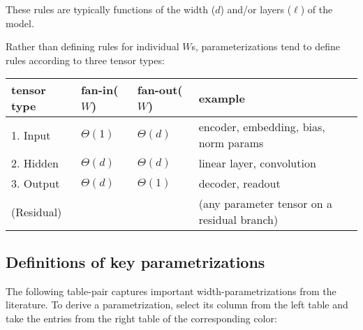 \documentclass{article}
\begin{document}
\noindent
These rules are typically functions of the width ($d$) and/or layers ($\ell$) of the model.

\vspace{0.5em}

\noindent
Rather than defining rules for individual $W$s, parameterizations tend to define rules according to three tensor types:

\vspace{-1em}
\noindent
\begin{table}[ht]
    \centering
    \begin{tabular}{@{}p{7em}@{}p{5em}p{5.5em}p{19em}}
        \toprule
        tensor type & fan-in($W$) & fan-out($W$) & example\\
        \midrule
        1. Input & $\Theta(1)$ & $\Theta(d)$ & encoder, embedding, bias, norm params\\
        2. Hidden & $\Theta(d)$ & $\Theta(d)$ & linear layer, convolution\\
        3. Output & $\Theta(d)$ & $\Theta(1)$ & decoder, readout\\
        (Residual) & & & (any parameter tensor on a residual branch)\\
        \bottomrule
    \end{tabular}
\end{table}

\vspace{-1.5em}

\subsection*{Definitions of key parametrizations}

The following table-pair captures important width-parametrizations from the literature. To derive a parametrization, select its column from the left table and take the entries from the right table of the corresponding color:

\def\arraystretch{1.5}%

\setlength{\aboverulesep}{0pt} %
\setlength{\belowrulesep}{0pt} %
\end{document}
